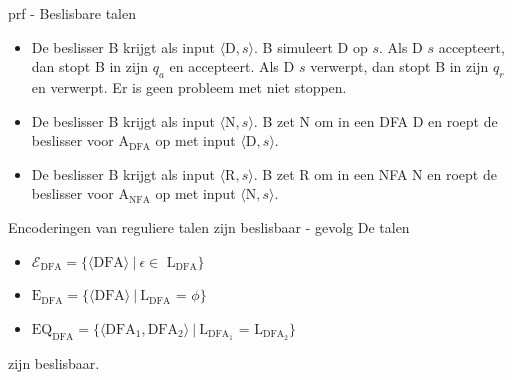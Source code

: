 \begin{prf}{prf - Beslisbare talen}
    \vspace{-0.1cm}
    \begin{itemize}
        \item 
            De beslisser B krijgt als input $\langle \text{D}, s\rangle$. B simuleert D op $s$. Als D $s$ accepteert, dan stopt B in zijn $q_a$ en accepteert. Als D $s$ verwerpt, dan stopt B in zijn $q_r$ en verwerpt. Er is geen probleem met niet stoppen.
        \item 
            De beslisser B krijgt als input $\langle \text{N}, s\rangle$. B zet N om in een DFA D en roept de beslisser voor A$_{\text{DFA}}$ op met input $\langle \text{D}, s\rangle$.
        \item 
            De beslisser B krijgt als input $\langle \text{R}, s\rangle$. B zet R om in een NFA N en roept de beslisser voor A$_{\text{NFA}}$ op met input $\langle \text{N}, s\rangle$.
    \end{itemize}
    \vspace{-0.3cm}
\end{prf}

\newpage

\begin{lem}{Encoderingen van reguliere talen zijn beslisbaar - gevolg}
    \vspace{-0.1cm}
    De talen
    \begin{itemize}
        \item 
            $\mathcal{E}_{\text{DFA}} = \{\langle \text{DFA} \rangle \ | \ \text{$\epsilon \in$ L$_{\text{DFA}}$} \}$
        \item 
            $\text{E}_{\text{DFA}} = \{\langle \text{DFA} \rangle \ | \ \text{L$_{\text{DFA}}$ = $\phi$} \}$
        \item 
            $\text{EQ}_{\text{DFA}} = \{\langle \text{DFA$_1$}, \text{DFA$_2$} \rangle \ | \ \text{L$_{\text{DFA$_1$}}$ = L$_{\text{DFA$_2$}}$} \}$
    \end{itemize}
    zijn beslisbaar.
    \vspace{-0.1cm}
\end{lem}

